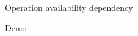 \begin{frame}{Operation availability dependency}
  \begin{figure}
    \centering
    
  \end{figure}
\end{frame}



\begin{frame}{}{}
  \begin{center}
    \vspace{15pt}
    {\Huge Demo}
  \end{center}
\end{frame}